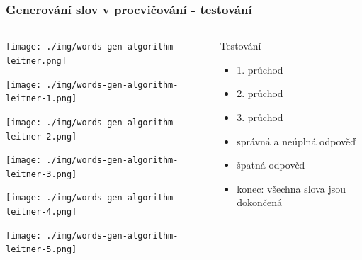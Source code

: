 \begin{frame}[fragile]
    \frametitle{Generování slov v procvičování - testování}
    \begin{columns}[T] %
        \begin{column}{.48\textwidth}
             {\begin{center}\texttt{[image: ./img/words-gen-algorithm-leitner.png]}\end{center}}
             {\begin{center}\texttt{[image: ./img/words-gen-algorithm-leitner-1.png]}\end{center}}
             {\begin{center}\texttt{[image: ./img/words-gen-algorithm-leitner-2.png]}\end{center}}
             {\begin{center}\texttt{[image: ./img/words-gen-algorithm-leitner-3.png]}\end{center}}
             {\begin{center}\texttt{[image: ./img/words-gen-algorithm-leitner-4.png]}\end{center}}
             {\begin{center}\texttt{[image: ./img/words-gen-algorithm-leitner-5.png]}\end{center}}
        \end{column}%
        \hfill%
        \begin{column}{.48\textwidth}
            \begin{block}{Testování}
                \begin{itemize}
                    \item<2-> 1. průchod
                    \item<3-> 2. průchod
                    \item<4-> 3. průchod
                    \item<5-> správná a neúplná odpověď
                    \item<6-> špatná odpověď
                    \item<7-> konec: všechna slova jsou dokončená
                \end{itemize}
            \end{block}
        \end{column}%
    \end{columns}
\end{frame}

